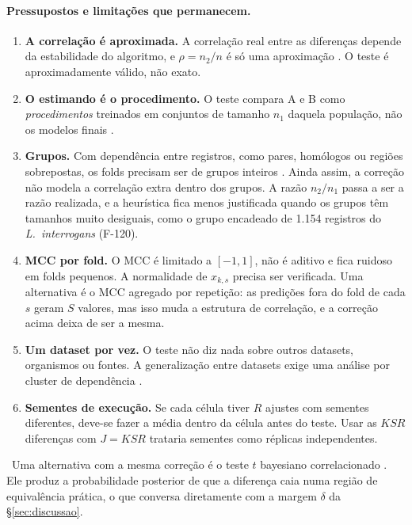 \documentclass[11pt,a4paper]{article}
\newcommand{\etiqueta}[2]{\tcbox[on line, colback=#1!10, colframe=#1!75!black,
  boxrule=0.4pt, arc=1.2pt, left=1.5pt, right=1.5pt, top=0pt, bottom=0pt,
  fontupper=\sffamily\scriptsize\bfseries]{#2}}
\newcommand{\rec}{\etiqueta{oiVerm}{Recomendação}}
\begin{document}
\paragraph{Pressupostos e limitações que permanecem.}
\begin{enumerate}[leftmargin=1.4em]
\item \textbf{A correlação é aproximada.} A correlação real entre as diferenças depende da estabilidade do algoritmo, e $\rho=n_2/n$ é só uma aproximação \citep{nadeau2003,bengio2004}. O teste é aproximadamente válido, não exato.
\item \textbf{O estimando é o procedimento.} O teste compara A e B como \emph{procedimentos} treinados em conjuntos de tamanho $n_1$ daquela população, não os modelos finais \citep{bates2024}.
\item \textbf{Grupos.} Com dependência entre registros, como pares, homólogos ou regiões sobrepostas, os folds precisam ser de grupos inteiros \citep{roberts2017,teufel2023}. Ainda assim, a correção não modela a correlação extra dentro dos grupos. A razão $n_2/n_1$ passa a ser a razão realizada, e a heurística fica menos justificada quando os grupos têm tamanhos muito desiguais, como o grupo encadeado de 1.154 registros do \emph{L.\ interrogans} (F-120).
\item \textbf{MCC por fold.} O MCC é limitado a $[-1,1]$, não é aditivo e fica ruidoso em folds pequenos. A normalidade de $x_{k,s}$ precisa ser verificada. Uma alternativa é o MCC agregado por repetição: as predições fora do fold de cada $s$ geram $S$ valores, mas isso muda a estrutura de correlação, e a correção acima deixa de ser a mesma.
\item \textbf{Um dataset por vez.} O teste não diz nada sobre outros datasets, organismos ou fontes. A generalização entre datasets exige uma análise por cluster de dependência \citep{demsar2006}.
\item \textbf{Sementes de execução.} Se cada célula tiver $R$ ajustes com sementes diferentes, deve-se fazer a média dentro da célula antes do teste. Usar as $KSR$ diferenças com $J=KSR$ trataria sementes como réplicas independentes.
\end{enumerate}

\rec\ Uma alternativa com a mesma correção é o teste $t$ bayesiano correlacionado \citep{benavoli2017}. Ele produz a probabilidade posterior de que a diferença caia numa região de equivalência prática, o que conversa diretamente com a margem $\delta$ da \S\ref{sec:discussao}.
\end{document}
